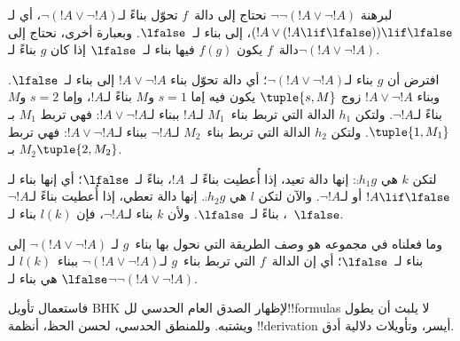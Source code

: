 \documentclass[../../../include/open-logic-section]{subfiles}
\begin{document}
\begin{ex}
لبرهنة $\lnot \lnot (!A \lor \lnot !A)$ نحتاج إلى دالة~$f$ تحوّل
بناءً لـ$\lnot(!A \lor \lnot !A)$، أي لـ
$(!A \lor (!A \lif \lfalse)) \lif \lfalse$، إلى بناء لـ~$\lfalse$.
وبعبارة أخرى، نحتاج إلى دالة~$f$ يكون $f(g)$ فيها بناء لـ~$\lfalse$
إذا كان $g$ بناءً لـ$\lnot(!A \lor \lnot !A)$.

افترض أن $g$ بناء لـ$\lnot(!A \lor \lnot !A)$؛ أي دالة تحوّل بناء
$!A \lor \lnot !A$ إلى بناء لـ~$\lfalse$. وبناء
$!A \lor \lnot !A$ زوج $\tuple{s, M}$ يكون فيه إما $s = 1$ و$M$
بناءً لـ$!A$، وإما $s = 2$ و$M$ بناءً لـ$\lnot !A$. ولتكن $h_1$
الدالة التي تربط بناء~$M_1$ لـ$!A$ ببناء لـ$!A \lor \lnot !A$:
فهي تربط $M_1$ بـ$\tuple{1, M_1}$. ولتكن $h_2$ الدالة التي تربط
بناء~$M_2$ لـ$\lnot !A$ ببناء لـ$!A \lor \lnot !A$: فهي تربط
$M_2$ بـ$\tuple{2, M_2}$.

لتكن $k$ هي $\comp{h_1}{g}$: إنها دالة تعيد، إذا أُعطيت بناءً لـ~$!A$،
بناءً لـ~$\lfalse$؛ أي إنها بناء لـ$!A \lif \lfalse$ أو لـ$\lnot !A$.
والآن لتكن $l$ هي $\comp{h_2}{g}$. إنها دالة تعطي، إذا أُعطيت بناءً
لـ$\lnot !A$، بناءً لـ~$\lfalse$. ولأن $k$ بناء لـ$\lnot !A$، فإن
$l(k)$ بناء لـ~$\lfalse$.

وما فعلناه في مجموعه هو وصف الطريقة التي نحول بها بناء~$g$ لـ
$\lnot(!A \lor \lnot !A)$ إلى بناء لـ~$\lfalse$؛ أي إن الدالة~$f$
التي تربط بناء~$g$ لـ$\lnot(!A \lor \lnot !A)$ ببناء~$l(k)$ لـ
$\lfalse$ هي بناء لـ$\lnot\lnot(!A \lor \lnot !A)$.
\end{ex}

فاستعمال تأويل BHK لإظهار الصدق العام الحدسي لل!!{formula}s لا يلبث أن
يطول ويشتبه. وللمنطق الحدسي، لحسن الحظ، أنظمة !!{derivation} أيسر،
وتأويلات دلالية أدق.
\end{document}
